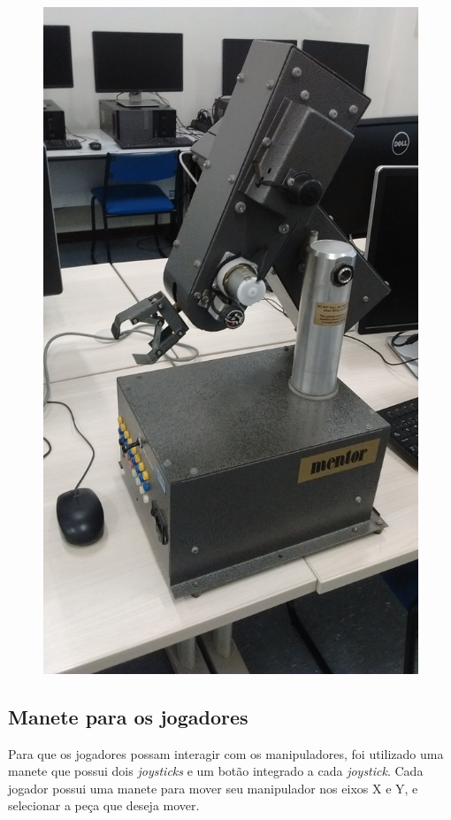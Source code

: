 \begin{figure}[H]
\begin{minipage}{.5\textwidth}
        \includegraphics[keepaspectratio=true, width=0.9\linewidth]
            {img/foto-manipulador-preto.jpg}
        \label{fig:fotoManipuladorPreto}
    \end{minipage}
\end{figure}

\subsection[Manete para os jogadores]{Manete para os jogadores}

Para que os jogadores possam interagir com os manipuladores, foi utilizado uma manete que possui dois \textit{joysticks} e um botão integrado a cada \textit{joystick}.
Cada jogador possui uma manete para mover seu manipulador nos eixos X e Y, e selecionar a peça que deseja mover.


